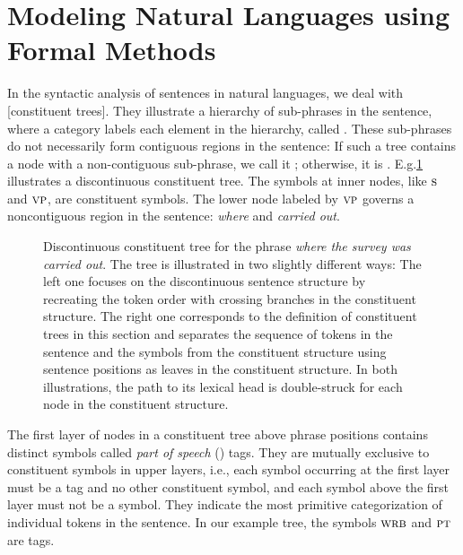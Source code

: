 \documentclass[../document.tex]{subfiles}
\begin{document}
    \section{Modeling Natural Languages using Formal Methods}\label{sec:preliminaries:ctrees}
    In the syntactic analysis of sentences in natural languages, we deal with [constituent trees].
    They illustrate a hierarchy of sub-phrases in the sentence, where a category labels each element in the hierarchy, called .
    These sub-phrases do not necessarily form contiguous regions in the sentence:
    If such a tree contains a node with a non-contiguous sub-phrase, we call it ; otherwise, it is .
    E.g.\@ \cref{fig:pre:ctree} illustrates a discontinuous constituent tree.
    The symbols at inner nodes, like \(\textsc{s}\) and \(\textsc{vp}\), are constituent symbols.
    The lower node labeled by \(\textsc{vp}\) governs a noncontiguous region in the sentence: \emph{where} and \emph{carried out}.

    \begin{figure}
        \null\hfill
        
        \hfill\null

        \caption{\label{fig:pre:ctree}
            Discontinuous constituent tree for the phrase \emph{where the survey was carried out}.
            The tree is illustrated in two slightly different ways: 
                The left one focuses on the discontinuous sentence structure by recreating the token order with crossing branches in the constituent structure.
                The right one corresponds to the definition of constituent trees in this section and separates the sequence of tokens in the sentence and the  symbols from the constituent structure using sentence positions as leaves in the constituent structure.
            In both illustrations, the path to its lexical head is double-struck for each node in the constituent structure.
        }
    \end{figure}

    The first layer of nodes in a constituent tree above phrase positions contains distinct symbols called \emph{part of speech} () tags.
    They are mutually exclusive to constituent symbols in upper layers, i.e., each symbol occurring at the first layer must be a  tag and no other constituent symbol, and each symbol above the first layer must not be a  symbol.
    They indicate the most primitive categorization of individual tokens in the sentence.
    In our example tree, the symbols \(\textsc{wrb}\) and \(\textsc{pt}\) are  tags.
\end{document}
